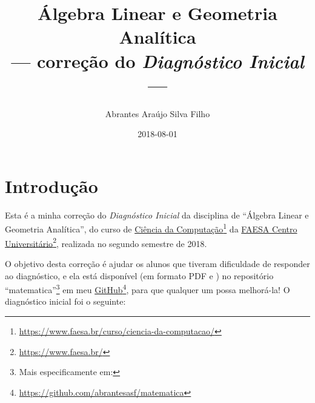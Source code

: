 \documentclass[pdftex, brazil, 12pt, oneside]{article}
\begin{document}
\title{Álgebra Linear e Geometria Analítica\\
--- correção do \emph{Diagnóstico Inicial} ---}
\author{Abrantes Araújo Silva Filho}
\date{2018-08-01}
\maketitle


\section{Introdução}
\label{intro}

Esta é a minha correção do \emph{Diagnóstico Inicial} da disciplina de
``Álgebra Linear e Geometria Analítica'', do curso de
\href{https://www.faesa.br/curso/ciencia-da-computacao/}{Ciência da Computação}\footnote{
  \url{https://www.faesa.br/curso/ciencia-da-computacao/}}
da \href{https://www.faesa.br/}{FAESA Centro Universitário}\footnote{
  \url{https://www.faesa.br/}}, realizada no segundo semestre de 2018.

O objetivo desta correção é ajudar os alunos que tiveram dificuldade de responder
ao diagnóstico, e ela está disponível (em formato PDF e \LaTeXe)
no repositório ``matematica''\footnote{
  Mais especificamente em: }
em meu \href{https://github.com/abrantesasf/matematica}{GitHub}\footnote{
  \url{https://github.com/abrantesasf/matematica}}, para que qualquer um possa melhorá-la!
O diagnóstico inicial foi o seguinte:
\end{document}
